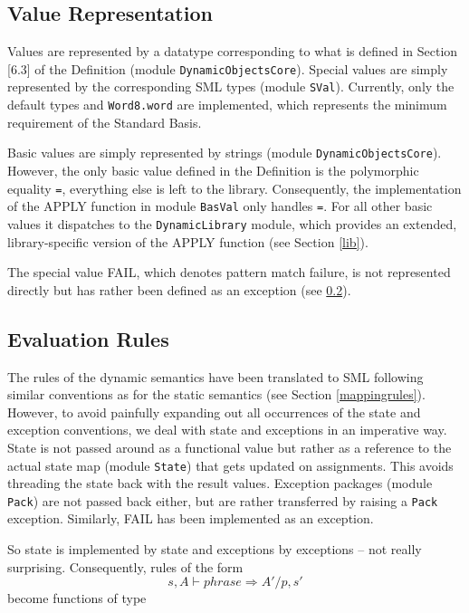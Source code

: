 \documentclass[twoside,titlepage]{article}
\begin{document}
\subsection{Value Representation}
\label{values}

Values are represented by a datatype corresponding to what is defined in Section [6.3] of the Definition (module {\tt DynamicObjectsCore}). Special values are simply represented by the corresponding SML types (module {\tt SVal}). Currently, only the default types and {\tt Word8.word} are implemented, which represents the minimum requirement of the Standard Basis.

Basic values are simply represented by strings (module {\tt DynamicObjectsCore}). However, the only basic value defined in the Definition is the polymorphic equality {\tt =}, everything else is left to the library. Consequently, the implementation of the APPLY function in module {\tt BasVal} only handles {\tt =}. For all other basic values it dispatches to the {\tt DynamicLibrary} module, which provides an extended, library-specific version of the APPLY function (see Section \ref{lib}).

The special value FAIL, which denotes pattern match failure, is not represented directly but has rather been defined as an exception (see \ref{evaluationrules}).


\subsection{Evaluation Rules}
\label{evaluationrules}

The rules of the dynamic semantics have been translated to SML following similar conventions as for the static semantics (see Section \ref{mappingrules}). However, to avoid painfully expanding out all occurrences of the state and exception conventions, we deal with state and exceptions in an imperative way. State is not passed around as a functional value but rather as a reference to the actual state map (module {\tt State}) that gets updated on assignments. This avoids threading the state back with the result values. Exception packages (module {\tt Pack}) are not passed back either, but are rather transferred by raising a {\tt Pack} exception. Similarly, FAIL has been implemented as an exception.

So state is implemented by state and exceptions by exceptions -- not really surprising. Consequently, rules of the form
%
\begin{displaymath}
s,A \vdash \mathit{phrase} \Rightarrow A'/p,s'
\end{displaymath}
%
become functions of type
\end{document}
